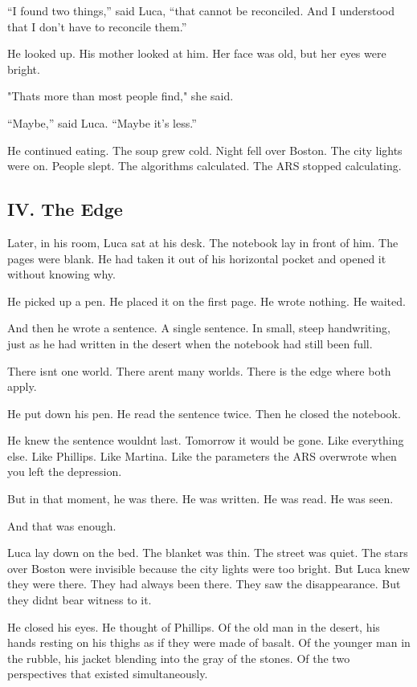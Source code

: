 \documentclass[
  ngerman,
]{article}
\begin{document}
``I found two things,'' said Luca, ``that cannot be reconciled. And I
understood that I don't have to reconcile them.''

He looked up. His mother looked at him. Her face was old, but her eyes
were bright.

"That\textquotesingle s more than most people find," she said.

``Maybe,'' said Luca. ``Maybe it's less.''

He continued eating. The soup grew cold. Night fell over Boston. The
city lights were on. People slept. The algorithms calculated. The ARS
stopped calculating.

\subsection{IV. The Edge}\label{iv.-the-edge}

Later, in his room, Luca sat at his desk. The notebook lay in front of
him. The pages were blank. He had taken it out of his horizontal pocket
and opened it without knowing why.

He picked up a pen. He placed it on the first page. He wrote nothing. He
waited.

And then he wrote a sentence. A single sentence. In small, steep
handwriting, just as he had written in the desert when the notebook had
still been full.

There isn\textquotesingle t one world. There aren\textquotesingle t many
worlds. There is the edge where both apply.

He put down his pen. He read the sentence twice. Then he closed the
notebook.

He knew the sentence wouldn\textquotesingle t last. Tomorrow it would be
gone. Like everything else. Like Phillips. Like Martina. Like the
parameters the ARS overwrote when you left the depression.

But in that moment, he was there. He was written. He was read. He was
seen.

And that was enough.

Luca lay down on the bed. The blanket was thin. The street was quiet.
The stars over Boston were invisible because the city lights were too
bright. But Luca knew they were there. They had always been there. They
saw the disappearance. But they didn\textquotesingle t bear witness to
it.

He closed his eyes. He thought of Phillips. Of the old man in the
desert, his hands resting on his thighs as if they were made of basalt.
Of the younger man in the rubble, his jacket blending into the gray of
the stones. Of the two perspectives that existed simultaneously.
\end{document}
